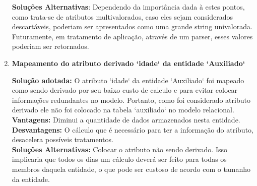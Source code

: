 \begin{enumerate}
    \textbf{Soluções Alternativas}: Dependendo da importância dada à estes pontos, como trata-se de atributos multivalorados, caso eles sejam considerados descartáveis, poderiam ser apresentados como uma grande string univalorada. Futuramente, em tratamento de aplicação, através de um parser, esses valores poderiam ser retornados.
    
    
    \item \textbf{Mapeamento do atributo derivado `idade` da entidade `Auxiliado`}
    
    \textbf{Solução adotada:} O atributo `idade` da entidade `Auxiliado` foi mapeado como sendo derivado por seu baixo custo de calculo e para evitar colocar informações redundantes no modelo. Portanto, como foi considerado atributo derivado ele não foi colocado na tabela `auxiliado` no modelo relacional.
    \\
    \textbf{Vantagens: } Diminui a quantidade de dados armazenados nesta entidade. 
    \\
    \textbf{Desvantagens: } O cálculo que é necessário para ter a informação do atributo, desacelera possíveis tratamentos.
    \\
    \textbf{Soluções Alternativas: } Colocar o atributo não sendo derivado. Isso implicaria que todos os dias um cálculo deverá ser feito para todas os membros daquela entidade, o que pode ser custoso de acordo com o tamanho da entidade.
    
\end{enumerate}